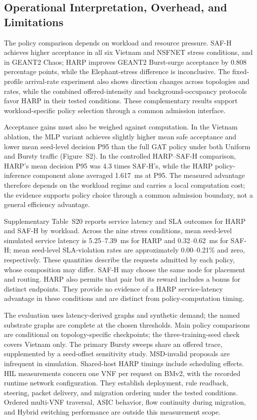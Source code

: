 \documentclass[final,5p]{elsarticle}
\newcommand{\rev}[1]{\textcolor{revisiongreen}{#1}}
\let\newrev\rev
\begin{document}
\subsection{\newrev{Operational Interpretation, Overhead, and Limitations}}
\label{subsec:operational_interpretation}
\newrev{The policy comparison depends on workload and resource pressure. SAF-H achieves higher acceptance in all six Vietnam and NSFNET stress conditions, and in GEANT2 Chaos; HARP improves GEANT2 Burst-surge acceptance by 0.808 percentage points, while the Elephant-stress difference is inconclusive. The fixed-profile arrival-rate experiment also shows direction changes across topologies and rates, while the combined offered-intensity and background-occupancy protocols favor HARP in their tested conditions. These complementary results support workload-specific policy selection through a common admission interface.}

\newrev{Acceptance gains must also be weighed against computation. In the Vietnam ablation, the MLP variant achieves slightly higher mean safe acceptance and lower mean seed-level decision P95 than the full GAT policy under both Uniform and Bursty traffic (Figure~S2). In the controlled HARP--SAF-H comparison, HARP's mean decision P95 was 4.3 times SAF-H's, while the HARP policy-inference component alone averaged 1.617~ms at P95. The measured advantage therefore depends on the workload regime and carries a local computation cost; the evidence supports policy choice through a common admission boundary, not a general efficiency advantage.}

\newrev{Supplementary Table~S20 reports service latency and SLA outcomes for HARP and SAF-H by workload. Across the nine stress conditions, mean seed-level simulated service latency is 5.25--7.39~ms for HARP and 0.32--0.62~ms for SAF-H; mean seed-level SLA-violation rates are approximately 0.00--0.21\% and zero, respectively. These quantities describe the requests admitted by each policy, whose composition may differ. SAF-H may choose the same node for placement and routing. HARP also permits that pair but its reward includes a bonus for distinct endpoints. They provide no evidence of a HARP service-latency advantage in these conditions and are distinct from policy-computation timing.}

\newrev{The evaluation uses latency-derived graphs and synthetic demand; the named substrate graphs are complete at the chosen thresholds. Main policy comparisons are conditional on topology-specific checkpoints; the three-training-seed check covers Vietnam only. The primary Bursty sweeps share an offered trace, supplemented by a seed-offset sensitivity study. MSD-invalid proposals are infrequent in simulation. Shared-host HARP timings include scheduling effects. HIL measurements concern one VNF per request on BMv2, with the recorded runtime network configuration. They establish deployment, rule readback, steering, packet delivery, and migration ordering under the tested conditions. Ordered multi-VNF traversal, ASIC behavior, flow continuity during migration, and Hybrid switching performance are outside this measurement scope.}
\end{document}
